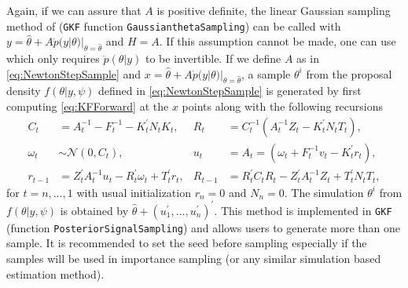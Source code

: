 \documentclass{article}
\newcommand{\GKF}{\texttt{GKF}\xspace}
\begin{document}
Again, if we can assure that $A$ is positive definite, the linear Gaussian sampling method of
\citet{durbin2002simple} (\GKF function \texttt{GaussianthetaSampling}) can be called with
$y=\hat{\theta} + A \dot{p}(y|\theta)|_{\theta=\hat{\theta}}$ and $H=A$. If this assumption
cannot be made, one can use \citet[Theorem~2]{jungbacker2007monte} which only requires
$\ddot{p}(\theta | y)$ to be invertible. If we define $A$ as in \eqref{eq:NewtonStepSample}
and $x=\hat{\theta} + A \dot{p}(y|\theta)|_{\theta=\hat{\theta}}$, a sample $\theta^i$ from
the proposal density $f(\theta|y,\psi)$ defined in \eqref{eq:NewtonStepSample} is generated
by first computing \eqref{eq:KFForward} at the $x$ points along with the following recursions
\begin{equation}\label{eq:SimSmootherAlgo}
\begin{aligned}
       C_t &= A_t^{-1} - F_t^{-1} -K_t^{\prime}N_t K_t
    ,& R_t &= C_t^{-1}(A_t^{-1} Z_t - K_t^{\prime}N_t T_t), \\
      \omega_t &\sim \mathcal{N}(0,C_t)
    ,& u_t &= A_t=(\omega_t + F_t^{-1} v_t - K_t^{\prime}r_t), \\
       r_{t-1} &= Z_t^{\prime} A_t^{-1}u_t - R_t^{\prime} \omega_t + T_t^{\prime}r_t
    ,& R_{t-1} &= R_t^{\prime}C_t R_t - Z_t^{\prime}A_t^{-1}Z_t + T_t^{\prime}N_tT_t
    ,
\end{aligned}
\end{equation}
for $t=n,\dots,1$ with usual initialization $r_n=0$ and $N_n=0$. The simulation $\theta^i$
from $f(\theta|y,\psi)$ is obtained by
$ \hat{\theta} + (u_1^\prime,\dots,u_n^\prime)^\prime$.  This method is implemented in \GKF
(function \texttt{PosteriorSignalSampling}) and allows users to generate more than one
sample. It is recommended to set the seed before sampling especially if the samples will be
used in importance sampling (or any similar simulation based estimation method).
\end{document}

